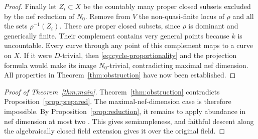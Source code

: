 \begin{proof}
Finally let $Z_i\subset X$ be the countably many proper closed
subsets excluded by the nef reduction of $N_0$.  Remove from $V$
the non-quasi-finite locus of $\rho$ and all the sets $\rho^{-1}(Z_i)$.
These are proper closed subsets, since $\rho$ is dominant and
generically finite.  Their complement contains very general points
because $k$ is uncountable.  Every curve through any point of this
complement maps to a curve on $X$.  If it were $D$-trivial, then
\eqref{eq:cycle-proportionality} and the projection formula would
make its image $N_0$-trivial, contradicting maximal nef dimension.
All properties in Theorem~\ref{thm:obstruction} have now been
established.
\end{proof}

\begin{proof}[Proof of Theorem~\ref{thm:main}]
Theorem~\ref{thm:obstruction} contradicts
Proposition~\ref{prop:prepared}.  The maximal-nef-dimension case is
therefore impossible.  By Proposition~\ref{prop:reduction}, it remains
to apply abundance in nef dimension at most two
\cite[Theorem~1.8]{XuNonvanishing}.  This gives semiampleness, and
faithful descent along the algebraically closed field extension gives
it over the original field.
\end{proof}
